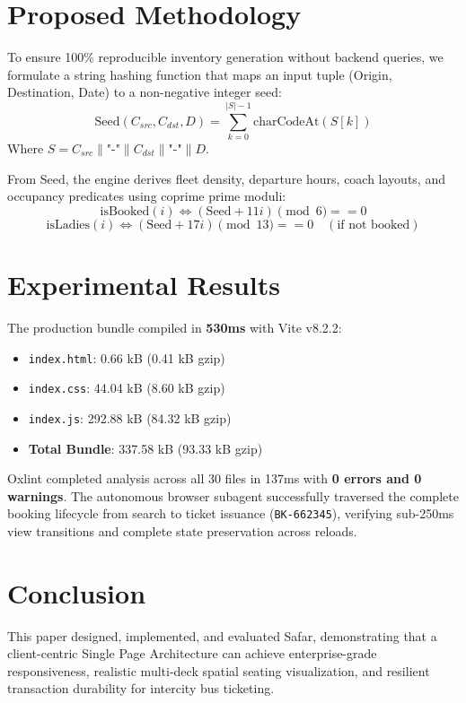 \documentclass[journal,10pt,onecolumn]{IEEEtran}
\begin{document}
\section{Proposed Methodology}
To ensure 100\% reproducible inventory generation without backend queries, we formulate a string hashing function that maps an input tuple (Origin, Destination, Date) to a non-negative integer seed:
\begin{equation}
\text{Seed}(C_{src}, C_{dst}, D) = \sum_{k=0}^{|S|-1} \text{charCodeAt}(S[k])
\end{equation}
Where $S = C_{src} \parallel \text{"-"} \parallel C_{dst} \parallel \text{"-"} \parallel D$.

From $\text{Seed}$, the engine derives fleet density, departure hours, coach layouts, and occupancy predicates using coprime prime moduli:
\begin{equation}
\text{isBooked}(i) \iff (\text{Seed} + 11i) \pmod 6 == 0
\end{equation}
\begin{equation}
\text{isLadies}(i) \iff (\text{Seed} + 17i) \pmod{13} == 0 \quad (\text{if not booked})
\end{equation}

\section{Experimental Results}
The production bundle compiled in \textbf{530ms} with Vite v8.2.2:
\begin{itemize}
    \item \texttt{index.html}: 0.66 kB (0.41 kB gzip)
    \item \texttt{index.css}: 44.04 kB (8.60 kB gzip)
    \item \texttt{index.js}: 292.88 kB (84.32 kB gzip)
    \item \textbf{Total Bundle}: 337.58 kB (93.33 kB gzip)
\end{itemize}

Oxlint completed analysis across all 30 files in 137ms with \textbf{0 errors and 0 warnings}. The autonomous browser subagent successfully traversed the complete booking lifecycle from search to ticket issuance (\texttt{BK-662345}), verifying sub-250ms view transitions and complete state preservation across reloads.

\section{Conclusion}
This paper designed, implemented, and evaluated Safar, demonstrating that a client-centric Single Page Architecture can achieve enterprise-grade responsiveness, realistic multi-deck spatial seating visualization, and resilient transaction durability for intercity bus ticketing.



\end{document}
